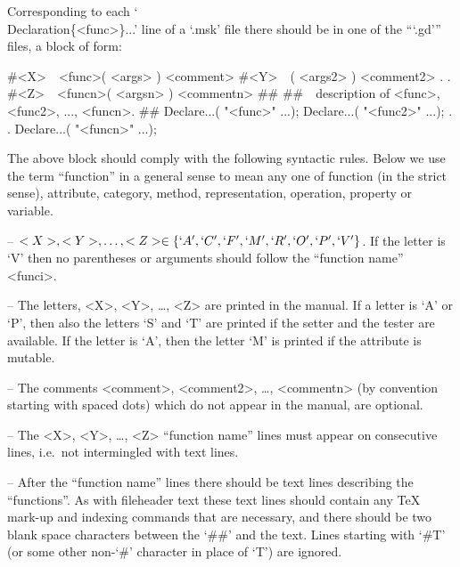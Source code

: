 Corresponding to each `\\Declaration\{<func>\}...' line of a `.msk'  file
there should be in one of the ```.gd''' files, a block of form:

\)\#<X>\ \ <func>( <args> ) <comment>
\)\#<Y>\ \ <func2>( <args2> ) <comment2>
\).
\).
\)\#<Z>\ \ <funcn>( <argsn> ) <commentn>
\)\#\#
\)\#\#\ \ description of <func>, <func2>, ..., <funcn>.
\)\#\#
Declare...( "<func>" ...);
Declare...( "<func2>" ...);
\).
\).
Declare...( "<funcn>" ...);

The above block should comply with the following syntactic  rules.  Below
we use the term ``function'' in a  general  sense  to  mean  any  one  of
function  (in   the   strict   sense),   attribute,   category,   method,
representation, operation, property or variable.

\beginlist%

\item{--}
$<X>, <Y>, \dots, <Z> \in \{ `A', `C', `F', `M', `R', `O', `P', `V'  \}$.
If the letter is `V' then no parentheses or arguments should  follow  the
``function name'' <funci>.

\item{--} 
The letters, <X>, <Y>, \dots, <Z> are printed in the manual. If a  letter
is `A' or `P', then also the letters `S'  and  `T'  are  printed  if  the
setter and the tester are available. If  the  letter  is  `A',  then  the
letter `M' is printed if the attribute is mutable.

\item{--}
The comments <comment>,  <comment2>,  \dots,  <commentn>  (by  convention
starting with spaced dots)  which  do  not  appear  in  the  manual,  are
optional.

\item{--}
The  <X>,  <Y>,  \dots,  <Z>  ``function  name''  lines  must  appear  on
consecutive lines, i.e.~not intermingled with text lines.

\item{--}
After the ``function name'' lines there should be text  lines  describing
the ``functions''. As  with  fileheader  text  these  text  lines  should
contain any {\TeX} mark-up and indexing commands that are necessary,  and
there should be two blank space characters between  the  `\#\#'  and  the
text. Lines starting with `\#T' (or  some  other  non-`\#'  character  in
place of `T') are ignored.

